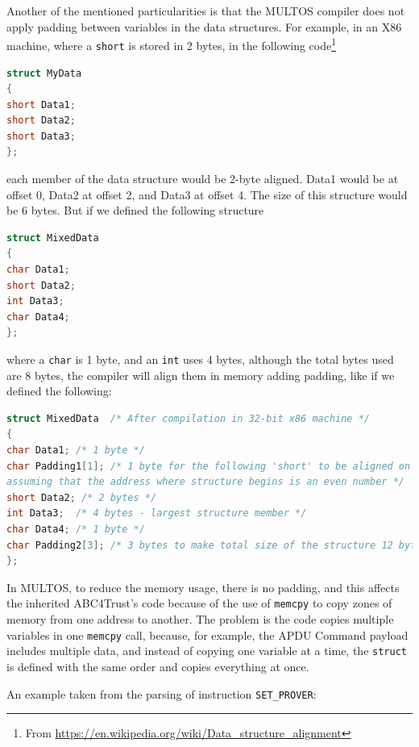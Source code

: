 \documentclass[journal]{IEEEtran}
\begin{document}
Another of the mentioned particularities is that the MULTOS compiler does not apply padding between variables in the data structures. For example, in an X86 machine, where a \texttt{short} is stored in 2 bytes, in the following code\footnote{From \url{https://en.wikipedia.org/wiki/Data_structure_alignment}}

\begin{lstlisting}[language=C]
struct MyData
{
short Data1;
short Data2;
short Data3;
};
\end{lstlisting}

each member of the data structure would be 2-byte aligned. Data1 would be at offset 0, Data2 at offset 2, and Data3 at offset 4. The size of this structure would be 6 bytes. But if we defined the following structure

\begin{lstlisting}[language=C]
struct MixedData
{
char Data1;
short Data2;
int Data3;
char Data4;
};
\end{lstlisting}

where a \texttt{char} is 1 byte, and an \texttt{int} uses 4 bytes, although the total bytes used are 8 bytes, the compiler will align them in memory adding padding, like if we defined the following:

\begin{lstlisting}[language=C]
struct MixedData  /* After compilation in 32-bit x86 machine */
{
char Data1; /* 1 byte */
char Padding1[1]; /* 1 byte for the following 'short' to be aligned on a 2 byte boundary
assuming that the address where structure begins is an even number */
short Data2; /* 2 bytes */
int Data3;  /* 4 bytes - largest structure member */
char Data4; /* 1 byte */
char Padding2[3]; /* 3 bytes to make total size of the structure 12 bytes */
};
\end{lstlisting}



\hfil


In MULTOS, to reduce the memory usage, there is no padding, and this affects the inherited ABC4Trust's code because of the use of \texttt{memcpy} to copy zones of memory from one address to another. The problem is the code copies multiple variables in one \texttt{memcpy} call, because, for example, the APDU Command payload includes multiple data, and instead of copying one variable at a time, the \texttt{struct} is defined with the same order and copies everything at once.

An example taken from the parsing of instruction \texttt{SET\_PROVER}:
\end{document}
